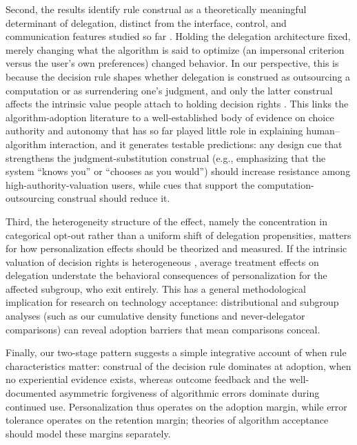 \documentclass[a4paper, 12pt, fleqn]{article}
\theoremstyle{definition}
\begin{document}
Second, the results identify rule construal as a theoretically meaningful determinant of delegation, distinct from the interface, control, and communication features studied so far \citep{Dietvorst2018,Hildebrand2021,Fink2024}. Holding the delegation architecture fixed, merely changing what the algorithm is said to optimize (an impersonal criterion versus the user's own preferences) changed behavior. In our perspective, this is because the decision rule shapes whether delegation is construed as outsourcing a computation or as surrendering one's judgment, and only the latter construal affects the intrinsic value people attach to holding decision rights \citep{Bartling2014,Owens2014,FreyBenzStutzer2004}. This links the algorithm-adoption literature to a well-established body of evidence on choice authority and autonomy \citep{Brehm1966,DeciRyan2000,Leotti2010} that has so far played little role in explaining human--algorithm interaction, and it generates testable predictions: any design cue that strengthens the judgment-substitution construal (e.g., emphasizing that the system ``knows you'' or ``chooses as you would'') should increase resistance among high-authority-valuation users, while cues that support the computation-outsourcing construal should reduce it.

Third, the heterogeneity structure of the effect, namely the concentration in categorical opt-out rather than a uniform shift of delegation propensities, matters for how personalization effects should be theorized and measured. If the intrinsic valuation of decision rights is heterogeneous \citep{Bartling2014,Owens2014}, average treatment effects on delegation understate the behavioral consequences of personalization for the affected subgroup, who exit entirely. This has a general methodological implication for research on technology acceptance: distributional and subgroup analyses (such as our cumulative density functions and never-delegator comparisons) can reveal adoption barriers that mean comparisons conceal.

Finally, our two-stage pattern suggests a simple integrative account of when rule characteristics matter: construal of the decision rule dominates at adoption, when no experiential evidence exists, whereas outcome feedback and the well-documented asymmetric forgiveness of algorithmic errors \citep{Dietvorst2015,Renier2021} dominate during continued use. Personalization thus operates on the adoption margin, while error tolerance operates on the retention margin; theories of algorithm acceptance should model these margins separately.
\end{document}
